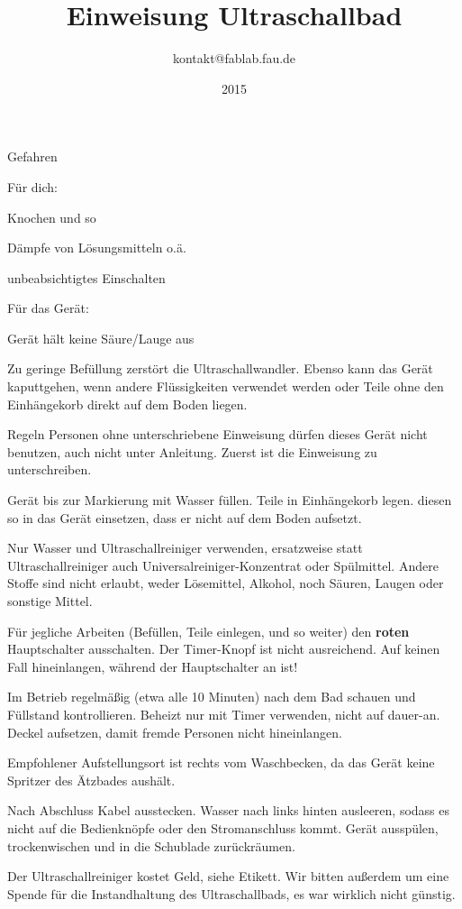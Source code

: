\documentclass{\basedir/fablab-document}
\date{2015}
\author{kontakt@fablab.fau.de}
\title{Einweisung Ultraschallbad}
\begin{document}
\begin{section}{Gefahren}

Für dich:

 Knochen und so

Dämpfe von Lösungsmitteln o.ä.

unbeabsichtigtes Einschalten


Für das Gerät:

Gerät hält keine Säure/Lauge aus

Zu geringe Befüllung zerstört die Ultraschallwandler. Ebenso kann das Gerät kaputtgehen, wenn andere Flüssigkeiten verwendet werden oder Teile ohne den Einhängekorb direkt auf dem Boden liegen.

\end{section}


\begin{section}{Regeln}
Personen ohne unterschriebene Einweisung dürfen dieses Gerät nicht benutzen, auch nicht unter Anleitung. Zuerst ist die Einweisung zu unterschreiben.

Gerät bis zur Markierung mit Wasser füllen. Teile in Einhängekorb legen. diesen so in das Gerät einsetzen, dass er nicht auf dem Boden aufsetzt.

Nur Wasser und Ultraschallreiniger verwenden, ersatzweise statt Ultraschallreiniger auch Universalreiniger-Konzentrat oder Spülmittel. Andere Stoffe sind nicht erlaubt, weder Lösemittel, Alkohol, noch Säuren, Laugen oder sonstige Mittel.

Für jegliche Arbeiten (Befüllen, Teile einlegen, und so weiter) den \textbf{roten} Hauptschalter ausschalten. Der Timer-Knopf ist nicht ausreichend. Auf keinen Fall hineinlangen, während der Hauptschalter an ist!

Im Betrieb regelmäßig (etwa alle 10 Minuten) nach dem Bad schauen und Füllstand kontrollieren. Beheizt nur mit Timer verwenden, nicht auf dauer-an. Deckel aufsetzen, damit fremde Personen nicht hineinlangen.

Empfohlener Aufstellungsort ist rechts vom Waschbecken, da das Gerät keine Spritzer des Ätzbades aushält.

Nach Abschluss Kabel ausstecken. Wasser nach links hinten ausleeren, sodass es nicht auf die Bedienknöpfe oder den Stromanschluss kommt. Gerät ausspülen, trockenwischen und in die Schublade zurückräumen.

Der Ultraschallreiniger kostet Geld, siehe Etikett. Wir bitten außerdem um eine Spende für die Instandhaltung des Ultraschallbads, es war wirklich nicht günstig.
\end{section}
\end{document}
